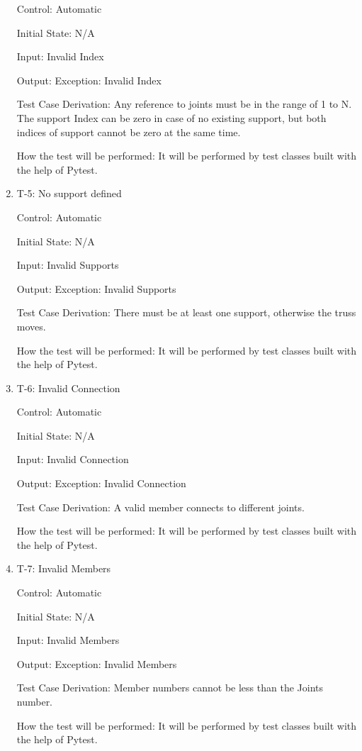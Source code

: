 \documentclass[12pt, titlepage]{article}
\begin{document}
\begin{enumerate}
Control: Automatic
					
Initial State: N/A
					
Input: Invalid Index
					
Output: Exception: Invalid Index

Test Case Derivation: Any reference to joints must be in the range of 1 to N. The support Index can be zero in case of no existing support, but both indices of support cannot be zero at the same time.

How the test will be performed: It will be performed by test classes built with the help of Pytest.


\item{T-5: No support defined \\}

Control: Automatic
					
Initial State: N/A
					
Input: Invalid Supports
					
Output: Exception: Invalid Supports

Test Case Derivation: There must be at least one support, otherwise the truss moves. 

How the test will be performed: It will be performed by test classes built with the help of Pytest.
\item{T-6: Invalid Connection \\}

Control: Automatic
					
Initial State: N/A
					
Input: Invalid Connection
					
Output: Exception: Invalid Connection

Test Case Derivation: A valid member connects to different joints.

How the test will be performed: It will be performed by test classes built with the help of Pytest.

\item{T-7: Invalid Members \\}

Control: Automatic
					
Initial State: N/A
					
Input: Invalid Members
					
Output: Exception: Invalid Members

Test Case Derivation: Member numbers cannot be less than the Joints number.

How the test will be performed: It will be performed by test classes built with the help of Pytest.

\end{enumerate}
\end{document}
